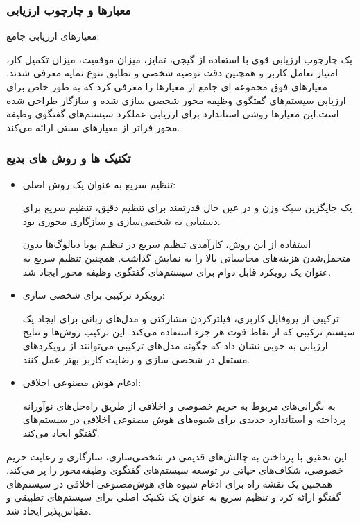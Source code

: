 \subsubsection{معیارها و چارچوب ارزیابی}
معیارهای ارزیابی جامع:

یک چارچوب ارزیابی قوی با استفاده از گیجی، تمایز، میزان موفقیت، میزان تکمیل کار، امتیاز تعامل کاربر و همچنین دقت توصیه شخصی و تطابق تنوع نمایه معرفی شدند.
معیارهای فوق مجموعه ای جامع از معیارها را معرفی کرد که به طور خاص برای ارزیابی سیستم‌های گفتگوی وظیفه محور شخصی سازی شده و سازگار طراحی شده است.این معیارها روشی استاندارد برای ارزیابی عملکرد سیستم‌های گفتگوی وظیفه محور فراتر از معیارهای سنتی ارائه می‌کند.


\subsubsection{تکنیک ها و روش های بدیع}


\begin{itemize}
\item
 تنظیم سریع به عنوان یک روش اصلی:

 یک جایگزین سبک وزن و در عین حال قدرتمند برای تنظیم دقیق، تنظیم سریع برای دستیابی به شخصی‌سازی و سازگاری محوری بود.
 
استفاده از این روش، کارآمدی تنظیم سریع در تنظیم پویا دیالوگ‌ها بدون متحمل‌شدن هزینه‌های محاسباتی بالا را به نمایش گذاشت. همچنین تنظیم سریع به عنوان یک رویکرد قابل دوام برای سیستم‌های گفتگوی وظیفه محور ایجاد شد.

\item
 رویکرد ترکیبی برای شخصی سازی:

 ترکیبی از پروفایل کاربری، فیلترکردن مشارکتی و مدل‌های زبانی برای ایجاد یک سیستم ترکیبی که از نقاط قوت هر جزء استفاده می‌کند. این ترکیب روش‌ها و نتایج ارزیابی به خوبی نشان داد که چگونه مدل‌های ترکیبی می‌توانند از رویکردهای مستقل در شخصی سازی و رضایت کاربر بهتر عمل کنند.

\item
 ادغام هوش مصنوعی اخلاقی:

 به نگرانی‌های مربوط به حریم خصوصی و اخلاقی از طریق راه‌حل‌های نوآورانه پرداخته و استاندارد جدیدی برای شیوه‌های هوش مصنوعی اخلاقی در سیستم‌های گفتگو ایجاد می‌کند.
\end{itemize}


این تحقیق با پرداختن به چالش‌های قدیمی در شخصی‌سازی، سازگاری و رعایت حریم خصوصی، شکاف‌های حیاتی در توسعه سیستم‌های گفتگوی وظیفه‌محور را پر می‌کند. همچنین یک نقشه راه برای ادغام شیوه های هوش‌مصنوعی اخلاقی در سیستم‌های گفتگو ارائه کرد و تنظیم سریع به عنوان یک تکنیک اصلی برای سیستم‌های تطبیقی ​​و مقیاس‌پذیر ایجاد شد.

